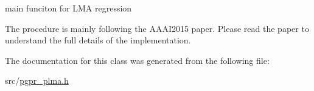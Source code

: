 main funciton for L\+M\+A regression 

The procedure is mainly following the A\+A\+A\+I2015 paper. Please read the paper to understand the full details of the implementation. 

The documentation for this class was generated from the following file\+:\begin{DoxyCompactItemize}
\item 
src/\hyperlink{pgpr__plma_8h}{pgpr\+\_\+plma.\+h}\end{DoxyCompactItemize}
